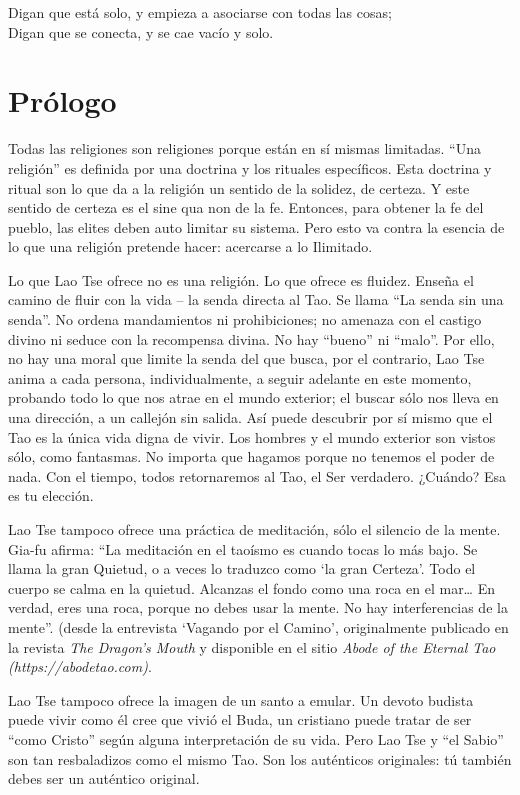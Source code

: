 \documentclass[book,b5paper,hidelinks,final]{memoir}
\begin{document}
	Digan que está solo, y empieza a asociarse con todas las cosas;\\
	Digan que se conecta, y se cae vacío y solo.
	
	\chapter*{Prólogo}
	
	Todas las religiones son religiones porque están en sí mismas limitadas.
	``Una religión'' es definida por una doctrina y los rituales
	específicos. Esta doctrina y ritual son lo que da a la religión un
	sentido de la solidez, de certeza. Y este sentido de certeza es el sine
	qua non de la fe. Entonces, para obtener la fe del pueblo, las elites
	deben auto limitar su sistema. Pero esto va contra la esencia de lo que
	una religión pretende hacer: acercarse a lo Ilimitado.
	
	Lo que Lao Tse ofrece no es una religión. Lo que ofrece es fluidez.
	Enseña el camino de fluir con la vida -- la senda directa al Tao. Se
	llama ``La senda sin una senda''. No ordena mandamientos ni
	prohibiciones; no amenaza con el castigo divino ni seduce con la
	recompensa divina. No hay ``bueno'' ni ``malo''. Por ello, no hay una
	moral que limite la senda del que busca, por el contrario, Lao Tse anima
	a cada persona, individualmente, a seguir adelante en este momento,
	probando todo lo que nos atrae en el mundo exterior; el buscar sólo nos
	lleva en una dirección, a un callejón sin salida. Así puede descubrir
	por sí mismo que el Tao es la única vida digna de vivir. Los hombres y
	el mundo exterior son vistos sólo, como fantasmas. No importa que
	hagamos porque no tenemos el poder de nada. Con el tiempo, todos
	retornaremos al Tao, el Ser verdadero. ¿Cuándo? Esa es tu elección.
	
	Lao Tse tampoco ofrece una práctica de meditación, sólo el silencio de
	la mente. Gia-fu afirma: ``La meditación en el taoísmo es cuando tocas
	lo más bajo. Se llama la gran Quietud, o a veces lo traduzco como `la
	gran Certeza'. Todo el cuerpo se calma en la quietud. Alcanzas el fondo
	como una roca en el mar\ldots{} En verdad, eres una roca, porque no
	debes usar la mente. No hay interferencias de la mente''. (desde la
	entrevista `Vagando por el Camino', originalmente publicado en la
	revista \textit{The Dragon's Mouth} y disponible en el sitio \textit{Abode
		of the Eternal Tao (https://abodetao.com)}.
	
	Lao Tse tampoco ofrece la imagen de un santo a emular. Un devoto budista
	puede vivir como él cree que vivió el Buda, un cristiano puede tratar de
	ser ``como Cristo'' según alguna interpretación de su vida. Pero Lao Tse
	y ``el Sabio'' son tan resbaladizos como el mismo Tao. Son los
	auténticos originales: tú también debes ser un auténtico original.
	
\end{document}
